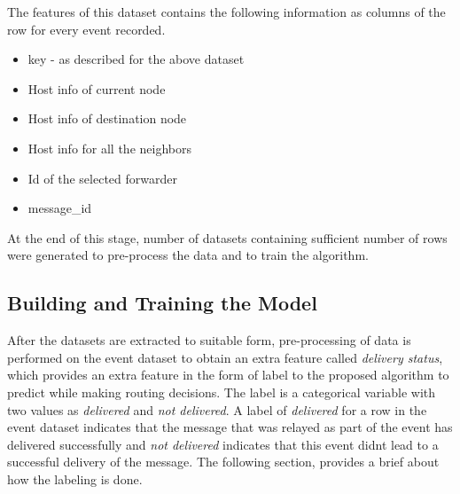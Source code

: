 \documentclass[10pt,journal]{IEEEtran}
\begin{document}
\begin{enumerate}
\begin {enumerate}
	\end {enumerate}
		The features of this dataset contains the following information as columns of the row for every event recorded. 
	\begin {itemize}
	 \item key - as described for the above dataset 
	 \item Host info of current node  
	 \item Host info of destination node  
	 \item Host info for all the neighbors 
	 \item Id of the selected forwarder  
	 \item message\_id 
	\end {itemize}
	
	At the end of this stage, number of datasets containing sufficient number of rows were generated to pre-process the data and to train the algorithm. 
		
\end{enumerate}

\subsection{Building and Training the Model}
After the datasets are extracted to suitable form, pre-processing of data is performed on the event dataset to obtain an extra feature called \emph{delivery status}, which provides an extra feature in the form of label to the proposed algorithm to predict while making routing decisions. The label is a categorical variable with two values as \emph{delivered} and \emph{not delivered}. A label of \emph{delivered} for a row in the event dataset indicates that the message that was relayed as part of the event has delivered successfully and \emph{not delivered} indicates that this event didn\textquotesingle t lead to a successful delivery of the message. 
The following section, provides a brief about how the labeling is done.
\end{document}
